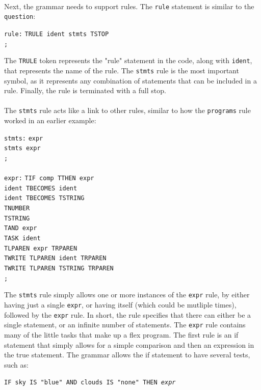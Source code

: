 \documentclass[12pt]{report}
\begin{document}
\\
Next, the grammar needs to support rules.  The \texttt{rule} statement is similar to the \texttt{question}:\\
\begin{tabbing}
\texttt{rule:} \= \texttt{TRULE ident stmts TSTOP}\\
\> \texttt{;}\\
\end{tabbing}
The \texttt{TRULE} token represents the "rule" statement in the code, along with \texttt{ident}, that represents the name of the rule.  The \texttt{stmts} rule is the most important symbol, as it represents any combination of statements that can be included in a rule.  Finally, the rule is terminated with a full stop.\\
\\
The \texttt{stmts} rule acts like a link to other rules, similar to how the \texttt{programs} rule worked in an earlier example:\\
\begin{tabbing}
	\texttt{stmts:} \= \texttt{expr}\\
	\> \texttt{\textbar \space stmts expr}\\
	\> \texttt{;}\\
	\\
	\texttt{expr:} \= \texttt{TIF comp TTHEN expr}\\
	\> \texttt{\textbar \space ident TBECOMES ident}\\
	\> \texttt{\textbar \space ident TBECOMES TSTRING}\\
	\> \texttt{\textbar \space TNUMBER}\\
	\> \texttt{\textbar \space TSTRING}\\
	\> \texttt{\textbar \space TAND expr}\\
	\> \texttt{\textbar \space TASK ident}\\
	\> \texttt{\textbar \space TLPAREN expr TRPAREN}\\
	\> \texttt{\textbar \space TWRITE TLPAREN ident TRPAREN}\\
	\> \texttt{\textbar \space TWRITE TLPAREN TSTRING TRPAREN}\\
	\> \texttt{;}\\
\end{tabbing}
The \texttt{stmts} rule simply allows one or more instances of the \texttt{expr} rule, by either having just a single \texttt{expr}, or having itself (which could be mutliple times), followed by the \texttt{expr} rule.  In short, the rule specifies that there can either be a single statement, or an infinite number of statements.  The \texttt{expr} rule contains many of the little tasks that make up a flex program.  The first rule is an if statement that simply allows for a simple comparison and then an expression in the true statement.  The grammar allows the if statement to have several tests, such as:\begin{center}
\texttt{IF sky IS "blue" AND clouds IS "none" THEN \textit{expr}}
\end{center}
\end{document}
